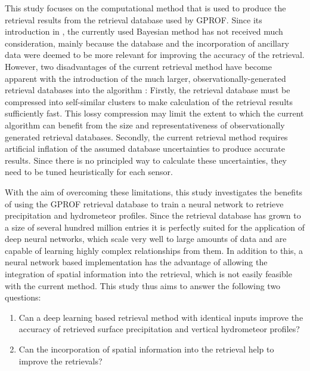\documentclass[a4paper,11pt,bibtotoc]{scrartcl}
\begin{document}
This study focuses on the computational method that is used to produce the
retrieval results from the retrieval database used by GPROF. Since its
introduction in \citet{kummerow96}, the currently used Bayesian method has not
received much consideration, mainly because the database and the incorporation
of ancillary data were deemed to be more relevant for improving the accuracy of
the retrieval. However, two disadvantages of the current retrieval method have
become apparent with the introduction of the much larger,
observationally-generated retrieval databases into the algorithm
\citep{elsaesser15}: Firstly, the retrieval database must be compressed into
self-similar clusters to make calculation of the retrieval results sufficiently
fast. This lossy compression may limit the extent to which the current algorithm
can benefit from the size and representativeness of observationally generated
retrieval databases. Secondly, the current retrieval method requires artificial
inflation of the assumed database uncertainties to produce accurate results.
Since there is no principled way to calculate these uncertainties, they need to
be tuned heuristically for each sensor.

With the aim of overcoming these limitations, this study investigates the
benefits of using the GPROF retrieval database to train a neural network to
retrieve precipitation and hydrometeor profiles. Since the retrieval database
has grown to a size of several hundred million entries it is perfectly suited
for the application of deep neural networks, which scale very well to large
amounts of data and are capable of learning highly complex relationships from
them. In addition to this, a neural network based implementation has the
advantage of allowing the integration of spatial information into the retrieval,
which is not easily feasible with the current method. This study thus aims to
answer the following two questions:
\begin{enumerate}
\item Can a deep learning based retrieval method with identical inputs improve
  the accuracy of retrieved surface precipitation and vertical hydrometeor
  profiles?
  \item Can the incorporation of spatial information into the retrieval help to
    improve the retrievals?
\end{enumerate}
\end{document}
